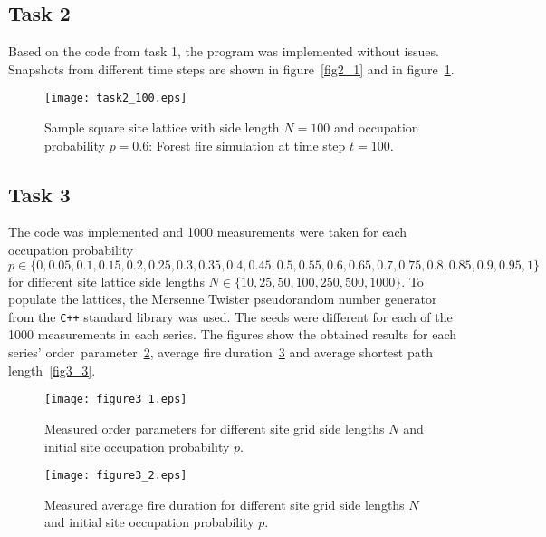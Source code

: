 \documentclass[11pt,a4paper]{article}
\begin{document}
\subsection{Task 2}
Based on the code from task 1, the program was implemented without issues. Snapshots from different time steps are shown in figure~\ref{fig2_1} and in figure~\ref{fig2_2}.


\begin{figure}[ht]
\begin{center}
\texttt{[image: task2\_100.eps]} 
\end{center}
\caption{Sample square site lattice with side length $N = 100$ and occupation probability $p=0.6$: Forest fire simulation at time step $t=100$.}
\label{fig2_2}
\end{figure}



\subsection{Task 3}
The code was implemented and 1000 measurements were taken for each occupation probability $p \in \{0, 0.05, 0.1, 0.15, 0.2, 0.25, 0.3, 0.35, 0.4, 0.45, 0.5, 0.55, 0.6, 0.65, 0.7, 0.75, 0.8, 0.85, 0.9, 0.95, 1\}$ for different site lattice side lengths $N \in \{10, 25, 50, 100, 250, 500, 1000\}$. To populate the lattices, the Mersenne Twister pseudorandom number generator from the \texttt{C++} standard library was used. The seeds were different for each of the 1000 measurements in each series. The figures show the obtained results for each series' order~parameter~\ref{fig3_1}, average fire duration~\ref{fig3_2} and average shortest path length~\ref{fig3_3}.


\begin{figure}[ht]
\begin{center}
\texttt{[image: figure3\_1.eps]} 
\end{center}
\caption{Measured order parameters for different site grid side lengths $N$ and initial site occupation probability $p$.}
\label{fig3_1}
\end{figure}

\begin{figure}[ht]
\begin{center}
\texttt{[image: figure3\_2.eps]} 
\end{center}
\caption{Measured average fire duration for different site grid side lengths $N$ and initial site occupation probability $p$.}
\label{fig3_2}
\end{figure}
\end{document}
